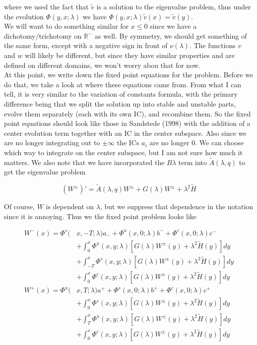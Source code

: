 \documentclass[12pt]{article}
\def\R{{\mathbb R}}
\begin{document}
where we used the fact that $\tilde{v}$ is a solution to the eigenvalue problem, thus under the evolution $\Phi(y, x; \lambda)$ we have $\Phi(y, x; \lambda)\tilde{v}(x) = \tilde{v}(y)$.\\

We will want to do something similar for $x \leq 0$ since we have a dichotomy/trichotomy on $\R^-$ as well. By symmetry, we should get something of the same form, except with a negative sign in front of $\nu(\lambda)$. The functions $v$ and $w$ will likely be different, but since they have similar properties and are defined on different domains, we won't worry abou that for now.\\

At this point, we write down the fixed point equations for the problem. Before we do that, we take a look at where these equations came from. From what I can tell, it is very similar to the variation of constants formula, with the primary difference being that we split the solution up into stable and unstable parts, evolve them separately (each with its own IC), and recombine them. So the fixed point equations should look like those in Sandstede (1998) with the addition of a center evolution term together with an IC in the center subspace. Also since we are no longer integrating out to $\pm \infty$ the ICs $a_i$ are no longer 0. We can choose which way to integrate on the center subspace, but I am not sure how much it matters. We also note that we have incorporated the $B \lambda$ term into $\tilde{A}(\lambda, q)$ to get the eigenvalue problem

\[
(W^\pm)' = \tilde{A}(\lambda, q) W^\pm + G(\lambda)W^\pm + \lambda^2 \tilde{H}
\]

Of course, $W$ is dependent on $\lambda$, but we suppress that dependence in the notation since it is annoying. Thus we the fixed point problem looks like

\begin{align*}
W^-(x) = \Phi^s(&x, -T; \lambda)a_- + \Phi^u(x, 0; \lambda)b^- + \Phi^c(x, 0; \lambda)c^- \\
&+ \int_0^x \Phi^u(x, y; \lambda)[ G(\lambda)W^\pm(y) + \lambda^2 \tilde{H}(y) ] dy \\
&+ \int_{-T}^x \Phi^s(x, y; \lambda) [ G(\lambda)W^\pm(y) + \lambda^2 \tilde{H}(y) ] dy \\
&+ \int_0^x \Phi^c(x, y; \lambda) [ G(\lambda)W^\pm(y) + \lambda^2 \tilde{H}(y) ]dy \\
W^+(x) = \Phi^u(&x, T; \lambda)a^+ + \Phi^s(x, 0; \lambda)b^+ + \Phi^c(x, 0; \lambda)c^+ \\
&+ \int_0^x \Phi^s(x, y; \lambda) [ G(\lambda)W^\pm(y) + \lambda^2 \tilde{H}(y) ] dy \\
&+ \int_T^x \Phi^u(x, y; \lambda) [ G(\lambda)W^\pm(y) + \lambda^2 \tilde{H}(y) ] dy \\
&+ \int_0^x \Phi^c(x, y; \lambda) [ G(\lambda)W^\pm(y) + \lambda^2 \tilde{H}(y) ] dy
\end{align*}
\end{document}
